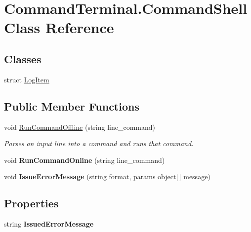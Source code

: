 \hypertarget{class_command_terminal_1_1_command_shell}{}\section{Command\+Terminal.\+Command\+Shell Class Reference}
\label{class_command_terminal_1_1_command_shell}
\subsection*{Classes}
\begin{DoxyCompactItemize}
\item 
struct \mbox{\hyperlink{struct_command_terminal_1_1_command_shell_1_1_log_item}{Log\+Item}}
\end{DoxyCompactItemize}
\subsection*{Public Member Functions}
\begin{DoxyCompactItemize}
\item 
void \mbox{\hyperlink{class_command_terminal_1_1_command_shell_af5edca56387a0b3400a8bcedf1e71274}{Run\+Command\+Offline}} (string line\+\_\+command)
\begin{DoxyCompactList}\small\item\em Parses an input line into a command and runs that command. \end{DoxyCompactList}\item 
\mbox{\label{class_command_terminal_1_1_command_shell_ae1174d82e4767807f20ee26740188811}} 
void {\bfseries Run\+Command\+Online} (string line\+\_\+command)
\item 
\mbox{\label{class_command_terminal_1_1_command_shell_a10aec52acc387b914854fa3ece955c8b}} 
void {\bfseries Issue\+Error\+Message} (string format, params object\mbox{[}$\,$\mbox{]} message)
\end{DoxyCompactItemize}
\subsection*{Properties}
\begin{DoxyCompactItemize}
\item 
\mbox{\label{class_command_terminal_1_1_command_shell_a2a98081ccf1a64f1445d2afc5a499fd7}} 
string {\bfseries Issued\+Error\+Message}
\end{DoxyCompactItemize}


